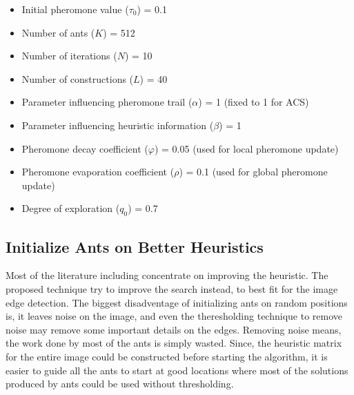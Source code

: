 \documentclass{llncs}
\begin{document}
	\begin{itemize}
		\item Initial pheromone value ($\tau_{0}$) = 0.1
		\item Number of ants ($K$) = 512
		\item Number of iterations ($N$) = 10
		\item Number of constructions ($L$) = 40
		\item Parameter influencing pheromone trail ($\alpha$) = 1 (fixed to 1 for ACS)
		\item Parameter influencing heuristic information ($\beta$) = 1
		\item Pheromone decay coefficient ($\varphi$) = 0.05 (used for local pheromone update)
		\item Pheromone evaporation coefficient ($\rho$) = 0.1 (used for global pheromone update)
		\item Degree of exploration ($q_{0}$) = 0.7
	\end{itemize}
	
	\subsection{Initialize Ants on Better Heuristics}\label{subsec:init_ants}
	Most of the literature including \cite{Manish:2013,Jian:2012} concentrate on improving the heuristic. The proposed technique try to improve the search instead, to best fit for the image edge detection. The biggest disadventage of initializing ants on random positions is, it leaves noise on the image, and even the theresholding technique to remove noise may remove some important details on the edges. Removing noise means, the work done by most of the ants is simply wasted. Since, the heuristic matrix for the entire image could be constructed before starting the algorithm, it is easier to guide all the ants to start at good locations where most of the solutions produced by ants could be used without thresholding.
	
\end{document}
